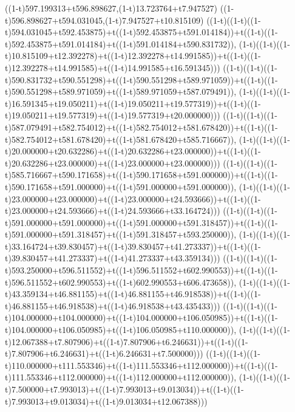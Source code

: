 ((1-t)597.199313+t596.898627,(1-t)13.723764+t7.947527)
((1-t)596.898627+t594.031045,(1-t)7.947527+t10.815109)
((1-t)((1-t)((1-t)594.031045+t592.453875)+t((1-t)592.453875+t591.014184))+t((1-t)((1-t)592.453875+t591.014184)+t((1-t)591.014184+t590.831732)),                                     (1-t)((1-t)((1-t)10.815109+t12.392278)+t((1-t)12.392278+t14.991585))+t((1-t)((1-t)12.392278+t14.991585)+t((1-t)14.991585+t16.591345)))
((1-t)((1-t)((1-t)590.831732+t590.551298)+t((1-t)590.551298+t589.971059))+t((1-t)((1-t)590.551298+t589.971059)+t((1-t)589.971059+t587.079491)),                                     (1-t)((1-t)((1-t)16.591345+t19.050211)+t((1-t)19.050211+t19.577319))+t((1-t)((1-t)19.050211+t19.577319)+t((1-t)19.577319+t20.000000)))
((1-t)((1-t)((1-t)587.079491+t582.754012)+t((1-t)582.754012+t581.678420))+t((1-t)((1-t)582.754012+t581.678420)+t((1-t)581.678420+t585.716667)),                                     (1-t)((1-t)((1-t)20.000000+t20.632286)+t((1-t)20.632286+t23.000000))+t((1-t)((1-t)20.632286+t23.000000)+t((1-t)23.000000+t23.000000)))
((1-t)((1-t)((1-t)585.716667+t590.171658)+t((1-t)590.171658+t591.000000))+t((1-t)((1-t)590.171658+t591.000000)+t((1-t)591.000000+t591.000000)),                                     (1-t)((1-t)((1-t)23.000000+t23.000000)+t((1-t)23.000000+t24.593666))+t((1-t)((1-t)23.000000+t24.593666)+t((1-t)24.593666+t33.164724)))
((1-t)((1-t)((1-t)591.000000+t591.000000)+t((1-t)591.000000+t591.318457))+t((1-t)((1-t)591.000000+t591.318457)+t((1-t)591.318457+t593.250000)),                                     (1-t)((1-t)((1-t)33.164724+t39.830457)+t((1-t)39.830457+t41.273337))+t((1-t)((1-t)39.830457+t41.273337)+t((1-t)41.273337+t43.359134)))
((1-t)((1-t)((1-t)593.250000+t596.511552)+t((1-t)596.511552+t602.990553))+t((1-t)((1-t)596.511552+t602.990553)+t((1-t)602.990553+t606.473658)),                                     (1-t)((1-t)((1-t)43.359134+t46.881155)+t((1-t)46.881155+t46.918538))+t((1-t)((1-t)46.881155+t46.918538)+t((1-t)46.918538+t43.435433)))
((1-t)((1-t)((1-t)104.000000+t104.000000)+t((1-t)104.000000+t106.050985))+t((1-t)((1-t)104.000000+t106.050985)+t((1-t)106.050985+t110.000000)),                                     (1-t)((1-t)((1-t)12.067388+t7.807906)+t((1-t)7.807906+t6.246631))+t((1-t)((1-t)7.807906+t6.246631)+t((1-t)6.246631+t7.500000)))
((1-t)((1-t)((1-t)110.000000+t111.553346)+t((1-t)111.553346+t112.000000))+t((1-t)((1-t)111.553346+t112.000000)+t((1-t)112.000000+t112.000000)),                                     (1-t)((1-t)((1-t)7.500000+t7.993013)+t((1-t)7.993013+t9.013034))+t((1-t)((1-t)7.993013+t9.013034)+t((1-t)9.013034+t12.067388)))
